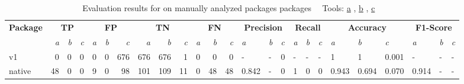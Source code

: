 \begin{table}[htp!]
    \centering
    \caption[Evaluation results for \toolSafer{} on manually analyzed packages packages]
        {Evaluation results for \toolSafer{} on manually analyzed packages packages~\newline \tiny ~\newline \footnotesize
        Tools: \underline{a} \toolSafer{}, \underline{b} \toolVet{}, \underline{c} \toolGosec{} \tiny ~\newline}
    \label{tbl:go-safer-evaluation-packages}
    \begin{adjustbox}{max width=\textwidth}
        \begin{tabular}{l||rrr|rrr|rrr|rrr||lll|lll|lll|lll}
            \textbf{Package} & \multicolumn{3}{c|}{\textbf{TP}}                & \multicolumn{3}{c|}{\textbf{FP}}                   & \multicolumn{3}{c|}{\textbf{TN}}                    & \multicolumn{3}{c||}{\textbf{FN}}                  & \multicolumn{3}{c|}{\textbf{Precision}}  & \multicolumn{3}{c|}{\textbf{Recall}}    & \multicolumn{3}{c|}{\textbf{Accuracy}}           & \multicolumn{3}{c}{\textbf{F1-Score}}    \\
            {}               & \textit{a}            & \textit{b} & \textit{c} & \textit{a}             & \textit{b} & \textit{c}   & \textit{a}            & \textit{b}   & \textit{c}   & \textit{a}             & \textit{b}  & \textit{c}  & \textit{a}     & \textit{b} & \textit{c} & \textit{a}    & \textit{b} & \textit{c} & \textit{a}     & \textit{b}     & \textit{c}     & \textit{a}     & \textit{b} & \textit{c} \\
            \hline
            v1               & 0                     & 0          & 0          & 0                      & 0          & 676          & 676                   & 676          & 1            & 0                      & 0           & 0           & -              & -          & 0          & -             & -          & -          & 1              & 1              & 0.001          & -              & -          & -          \\
            \rowcolor{verylightgray}
            native           & 48                    & 0          & 0          & 9                      & 0          & 98           & 101                   & 109          & 11           & 0                      & 48          & 48          & 0.842          & -          & 0          & 1             & 0          & 0          & 0.943          & 0.694          & 0.070          & 0.914          & -          & -          \\

\end{tabular}
\end{adjustbox}
\end{table}
